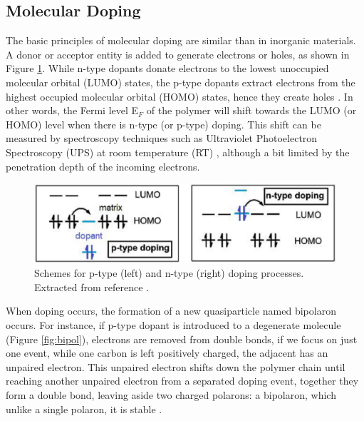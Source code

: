 
\subsection{Molecular Doping} \label{subsec:moldop}
The basic principles of molecular doping are similar than in inorganic materials. A donor or acceptor entity is added to generate electrons or holes, as shown in Figure \ref{fig:dopscheme}. While n-type dopants donate electrons to the lowest unoccupied molecular orbital (LUMO) states, the p-type dopants extract electrons from the highest occupied molecular orbital (HOMO) states, hence they create holes \cite{lussemDopingOrganicSemiconductors2013}. In other words, the Fermi level E$_{F}$ of the polymer will shift towards the LUMO (or HOMO) level when there is n-type (or p-type) doping. This shift can be measured by spectroscopy techniques such as Ultraviolet Photoelectron Spectroscopy (UPS) at room temperature (RT) \cite{tietzeFermiLevelShift2012}, although a bit limited by the penetration depth of the incoming electrons.

\begin{figure}[h]
  \centering
  \includegraphics[width=12cm]{Images/pdf/doping.pdf}
  \caption[Scheme of doping processes in organic semiconductors]{Schemes for p-type (left) and n-type (right) doping processes. Extracted from reference \cite{lussemDopingOrganicSemiconductors2013}.}
  \label{fig:dopscheme}
\end{figure}

When doping occurs, %
the formation of a new quasiparticle named bipolaron occurs. For instance, if p-type dopant is introduced to a degenerate molecule (Figure \ref{fig:bipol}), electrons are removed from double bonds, if we focus on just one event, while one carbon is left positively charged, the adjacent has an unpaired electron. This unpaired electron shifts down the polymer chain until reaching another unpaired electron from a separated doping event, together they form a double bond, leaving aside two charged polarons: a bipolaron, which unlike a single polaron, it is stable \cite{bredasPolaronsBipolaronsSolitons1985}. %

